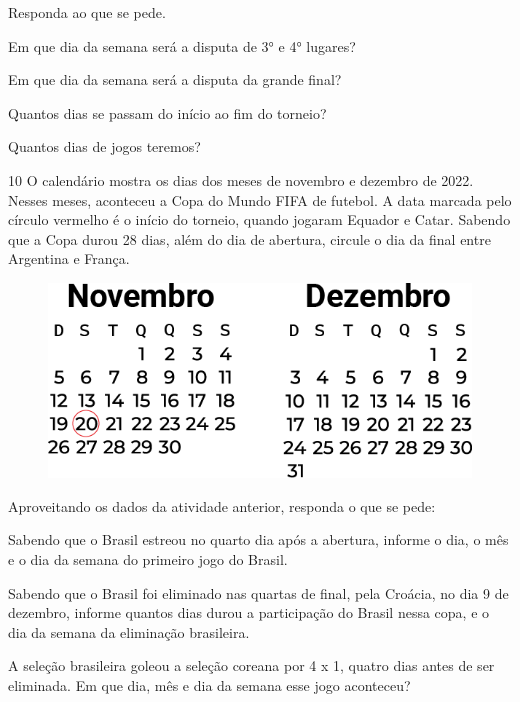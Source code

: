 Responda ao que se pede.

\begin{escolha}[itemsep=-5pt]
\item Em que dia da semana será a disputa de 3° e 4° lugares?

\item Em que dia da semana será a disputa da grande final?

\item Quantos dias se passam do início ao fim do torneio?

\item Quantos dias de jogos teremos?
\end{escolha}

\pagebreak
\num{10} O calendário mostra os dias dos meses de novembro e dezembro de
2022. Nesses meses, aconteceu a Copa do Mundo FIFA de futebol. A data
marcada pelo círculo vermelho é o início do torneio, quando jogaram
Equador e Catar. Sabendo que a Copa durou 28 dias, além do dia de abertura, circule o dia da
final entre Argentina e França.


\begin{figure}[htpb!]
\includegraphics[width=\textwidth]{./media/image59.png}
\end{figure}

Aproveitando os dados da atividade anterior, responda o que se pede:

\begin{escolha}[itemsep=-5pt]
\item Sabendo que o Brasil estreou no quarto dia após a abertura, informe o dia, o
  mês e o dia da semana do primeiro jogo do Brasil.

\item Sabendo que o Brasil foi eliminado nas quartas de final, pela Croácia,
  no dia 9 de dezembro, informe quantos dias durou a participação do
  Brasil nessa copa, e o dia da semana da eliminação brasileira.

\item A seleção brasileira goleou a seleção coreana por 4 x 1, quatro dias
  antes de ser eliminada. Em que dia, mês e dia da semana esse jogo
  aconteceu?
\end{escolha}

